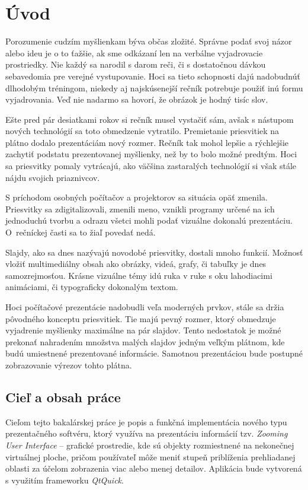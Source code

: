 \chapter{Úvod}

Porozumenie cudzím myšlienkam býva občas zložité. Správne podať svoj názor alebo ideu je o to ťažšie, ak sme odkázaní len na verbálne vyjadrovacie prostriedky. Nie každý sa narodil s darom reči, či s dostatočnou dávkou sebavedomia pre verejné vystupovanie. Hoci sa tieto schopnosti dajú nadobudnúť dlhodobým tréningom, niekedy aj najskúsenejší rečník potrebuje použiť inú formu vyjadrovania. Veď nie nadarmo sa hovorí, že obrázok je hodný tisíc slov.

Ešte pred pár desiatkami rokov si rečník musel vystačiť sám, avšak s nástupom nových technológií sa toto obmedzenie vytratilo. Premietanie priesvitiek na plátno dodalo prezentáciám nový rozmer. Rečník tak mohol lepšie a rýchlejšie zachytiť podstatu prezentovanej myšlienky, než by to bolo možné predtým. Hoci sa priesvitky pomaly vytrácajú, ako väčšina zastaralých technológií si však stále nájdu svojich priaznivcov.

S príchodom osobných počítačov a projektorov sa situácia opäť zmenila. Priesvitky sa zdigitalizovali, zmenili meno, vznikli programy určené na ich jednoduchú tvorbu a odrazu všetci mohli podať vizuálne dokonalú prezentáciu. O~rečníckej časti sa to žiaľ povedať nedá.

Slajdy, ako sa dnes nazývajú novodobé priesvitky, dostali mnoho funkcií. Možnosť vložiť multimediálny obsah ako obrázky, videá, grafy, či tabuľky je dnes samozrejmosťou. Krásne vizuálne témy idú ruka v ruke s oku lahodiacimi animáciami, či typograficky dokonalým textom.

Hoci počítačové prezentácie nadobudli veľa moderných prvkov, stále sa držia pôvodného konceptu priesvitiek. Tie majú pevný rozmer, ktorý obmedzuje vyjadrenie myšlienky maximálne na pár slajdov. Tento nedostatok je možné prekonať nahradením množstva malých slajdov jedným veľkým plátnom, kde budú umiestnené prezentované informácie. Samotnou prezentáciou bude postupné zobrazovanie výrezov tohto plátna.

\section{Cieľ a obsah práce}

Cieľom tejto bakalárskej práce je popis a funkčná implementácia nového typu prezentačného softvéru, ktorý využíva na prezentáciu informácií tzv. \textit{Zooming User Interface} -- grafické prostredie, kde sú objekty rozmiestnené na nekonečnej virtuálnej ploche, pričom používateľ môže meniť stupeň priblíženia prehliadanej oblasti za účelom zobrazenia viac alebo menej detailov. Aplikácia bude vytvorená s využitím frameworku \textit{QtQuick}.

